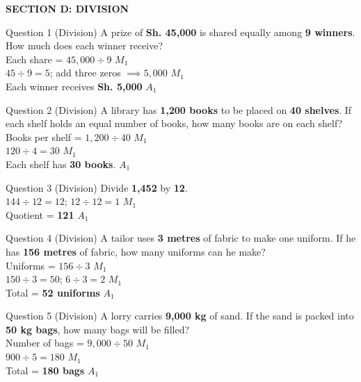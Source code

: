 \documentclass[12pt, a4paper, oneside]{article}
\begin{document}
\begin{center}
    \textbf{\color{strandcolor} SECTION D: DIVISION}
\end{center}

\begin{solvingbox}{Question 1 (Division)}
A prize of \textbf{Sh. 45,000} is shared equally among \textbf{9 winners}. How much does each winner receive? \\
Each share = $45,000 \div 9$ \hfill $M_1$ \\
$45 \div 9 = 5$; add three zeros $\implies 5,000$ \hfill $M_1$ \\
Each winner receives \textbf{Sh. 5,000} \hfill $A_1$
\end{solvingbox}

\begin{solvingbox}{Question 2 (Division)}
A library has \textbf{1,200 books} to be placed on \textbf{40 shelves}. If each shelf holds an equal number of books, how many books are on each shelf? \\
Books per shelf = $1,200 \div 40$ \hfill $M_1$ \\
$120 \div 4 = 30$ \hfill $M_1$ \\
Each shelf has \textbf{30 books}. \hfill $A_1$
\end{solvingbox}

\begin{solvingbox}{Question 3 (Division)}
Divide \textbf{1,452} by \textbf{12}. \\
$144 \div 12 = 12$; $12 \div 12 = 1$ \hfill $M_1$ \\
Quotient = \textbf{121} \hfill $A_1$
\end{solvingbox}

\begin{solvingbox}{Question 4 (Division)}
A tailor uses \textbf{3 metres} of fabric to make one uniform. If he has \textbf{156 metres} of fabric, how many uniforms can he make? \\
Uniforms = $156 \div 3$ \hfill $M_1$ \\
$150 \div 3 = 50$; $6 \div 3 = 2$ \hfill $M_1$ \\
Total = \textbf{52 uniforms} \hfill $A_1$
\end{solvingbox}

\begin{solvingbox}{Question 5 (Division)}
A lorry carries \textbf{9,000 kg} of sand. If the sand is packed into \textbf{50 kg bags}, how many bags will be filled? \\
Number of bags = $9,000 \div 50$ \hfill $M_1$ \\
$900 \div 5 = 180$ \hfill $M_1$ \\
Total = \textbf{180 bags} \hfill $A_1$
\end{solvingbox}
\end{document}
